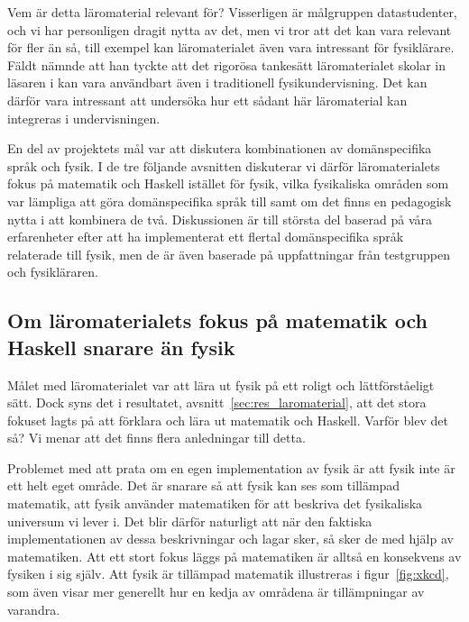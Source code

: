 Vem är detta läromaterial relevant för? Visserligen är målgruppen datastudenter, och vi har personligen dragit nytta av det,
men vi tror att det kan vara relevant för fler än så, till exempel kan läromaterialet även vara intressant för fysiklärare. Fäldt nämnde att han
tyckte att det rigorösa tankesätt läromaterialet skolar in läsaren i kan vara
användbart även i traditionell fysikundervisning. Det kan därför vara intressant att undersöka hur ett sådant här läromaterial kan
integreras i undervisningen.

En del av projektets mål var att diskutera kombinationen av
domänspecifika språk och fysik. I de tre följande avsnitten diskuterar vi därför
läromaterialets fokus på matematik och Haskell istället för fysik, vilka
fysikaliska områden som var lämpliga att göra domänspecifika språk till samt om
det finns en pedagogisk nytta i att kombinera de två. Diskussionen är till
största del baserad på våra erfarenheter efter att ha implementerat ett flertal
domänspecifika språk relaterade till fysik, men de är även baserade på
uppfattningar från testgruppen och fysikläraren.


\subsection{Om läromaterialets fokus på matematik och Haskell snarare än
fysik}\label{sec:fpf}

Målet med läromaterialet var att lära ut fysik på ett roligt och lättförståeligt
sätt. Dock syns det i resultatet, avsnitt~\ref{sec:res_laromaterial}, att det
stora fokuset lagts på att förklara och lära ut matematik och Haskell. Varför
blev det så? Vi menar att det finns flera anledningar till detta. 

Problemet med att prata om en egen implementation av fysik är att fysik inte är
ett helt eget område. Det är snarare så att fysik kan ses som tillämpad
matematik, att fysik använder matematiken för att beskriva det fysikaliska
universum vi lever i. Det blir därför naturligt att när den faktiska
implementationen av dessa beskrivningar och lagar sker, så sker de med hjälp av
matematiken. Att ett stort fokus läggs på matematiken är alltså en
konsekvens av fysiken i sig själv. Att fysik är tillämpad matematik illustreras i figur~\ref{fig:xkcd}, som även visar mer generellt hur en kedja av områdena är tillämpningar av varandra.


